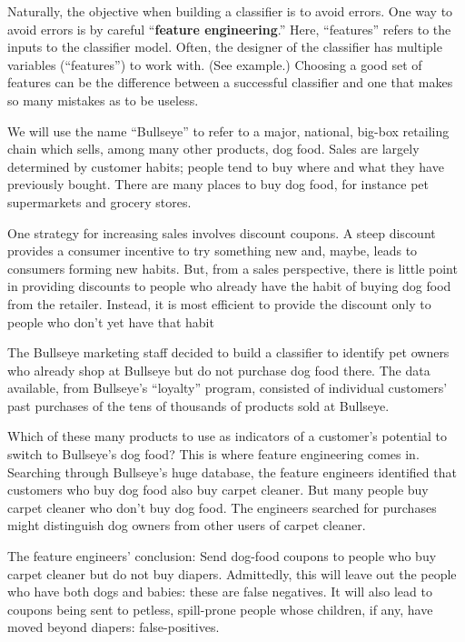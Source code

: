 \documentclass[
  letterpaper,
  DIV=11,
  numbers=noendperiod,
  oneside]{scrreprt}
\begin{document}
\begin{tcolorbox}[enhanced jigsaw, colbacktitle=quarto-callout-note-color!10!white, breakable, opacitybacktitle=0.6, colback=white, left=2mm, arc=.35mm, colframe=quarto-callout-note-color-frame, coltitle=black, toprule=.15mm, opacityback=0, leftrule=.75mm, bottomtitle=1mm, toptitle=1mm, titlerule=0mm, title=\textcolor{quarto-callout-note-color}{\faInfo}\hspace{0.5em}{Feature engineering: selling dog food}, rightrule=.15mm, bottomrule=.15mm]

Naturally, the objective when building a classifier is to avoid errors.
One way to avoid errors is by careful ``\textbf{feature engineering}.''
Here, ``features'' refers to the inputs to the classifier model. Often,
the designer of the classifier has multiple variables (``features'') to
work with. (See example.) Choosing a good set of features can be the
difference between a successful classifier and one that makes so many
mistakes as to be useless.

We will use the name ``Bullseye'' to refer to a major, national, big-box
retailing chain which sells, among many other products, dog food. Sales
are largely determined by customer habits; people tend to buy where and
what they have previously bought. There are many places to buy dog food,
for instance pet supermarkets and grocery stores.

One strategy for increasing sales involves discount coupons. A steep
discount provides a consumer incentive to try something new and, maybe,
leads to consumers forming new habits. But, from a sales perspective,
there is little point in providing discounts to people who already have
the habit of buying dog food from the retailer. Instead, it is most
efficient to provide the discount only to people who don't yet have that
habit

The Bullseye marketing staff decided to build a classifier to identify
pet owners who already shop at Bullseye but do not purchase dog food
there. The data available, from Bullseye's ``loyalty'' program,
consisted of individual customers' past purchases of the tens of
thousands of products sold at Bullseye.

Which of these many products to use as indicators of a customer's
potential to switch to Bullseye's dog food? This is where feature
engineering comes in. Searching through Bullseye's huge database, the
feature engineers identified that customers who buy dog food also buy
carpet cleaner. But many people buy carpet cleaner who don't buy dog
food. The engineers searched for purchases might distinguish dog owners
from other users of carpet cleaner.

The feature engineers' conclusion: Send dog-food coupons to people who
buy carpet cleaner but do not buy diapers. Admittedly, this will leave
out the people who have both dogs and babies: these are false negatives.
It will also lead to coupons being sent to petless, spill-prone people
whose children, if any, have moved beyond diapers: false-positives.

\end{tcolorbox}
\end{document}
